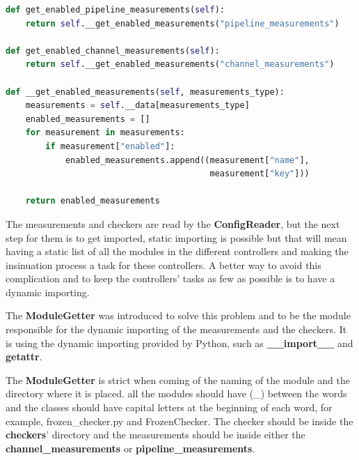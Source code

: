 \begin{lstlisting}[language=Python,label={code:get_measurements}, caption={Measurements getters in ConfigReader},captionpos=b]
def get_enabled_pipeline_measurements(self):
	return self.__get_enabled_measurements("pipeline_measurements")

def get_enabled_channel_measurements(self):
	return self.__get_enabled_measurements("channel_measurements")

def __get_enabled_measurements(self, measurements_type):
	measurements = self.__data[measurements_type]
	enabled_measurements = []
	for measurement in measurements:
		if measurement["enabled"]:
			enabled_measurements.append((measurement["name"],
										 measurement["key"]))

	return enabled_measurements
\end{lstlisting}

The measurements and checkers are read by the \textbf{ConfigReader}, but the next step for them is to get
imported, static importing is possible but that will mean having a static list of all the modules in the
different controllers and making the insinuation process a task for these controllers. A better way to avoid
this complication and to keep the controllers' tasks as few as possible is to have a dynamic importing.

The \textbf{ModuleGetter} was introduced to solve this problem and to be the module responsible for the dynamic
importing of the measurements and the checkers. It is using the dynamic importing provided by Python, such as
\textbf{\_\_import\_\_} and \textbf{getattr}.

The \textbf{ModuleGetter} is strict when coming of the naming of the module and the directory where it is
placed. all the modules should have (\_) between the words and the classes should have capital letters at the beginning
of each word, for example, frozen\_checker.py and FrozenChecker. The checker should be inside the
\textbf{checkers}' directory and the measurements should be inside either the \textbf{channel\_measurements} or
\textbf{pipeline\_measurements}.

